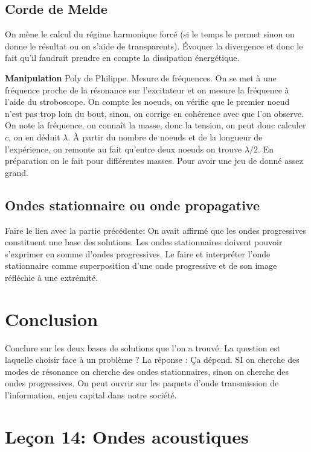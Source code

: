 \documentclass[french, a4paper, 10pt, twocolumn, landscape]{article}
\begin{document}
\subsection*{Corde de Melde}

On mène le calcul du régime harmonique forcé (si le temps le permet sinon on donne le résultat ou on s'aide de transparents). Évoquer la divergence et donc le fait qu'il faudrait prendre en compte la dissipation énergétique.

\textbf{Manipulation} Poly de Philippe. Mesure de fréquences. On se met à une fréquence proche de la résonance sur l'excitateur et on mesure la fréquence à l'aide du stroboscope. On compte les noeuds, on vérifie que le premier noeud n'est pas trop loin du bout, sinon, on corrige en cohérence avec que l'on observe. On note la fréquence, on connaît la masse, donc la tension, on peut donc calculer $c$, on en déduit $\lambda$. À partir du nombre de noeuds et de la longueur de l'expérience, on remonte au fait qu'entre deux noeuds on trouve $\lambda/2$. En préparation on le fait pour différentes masses. Pour avoir une jeu de donné assez grand.

\subsection*{Ondes stationnaire ou onde propagative}

Faire le lien avec la partie précédente: On avait affirmé que les ondes progressives constituent une base des solutions. Les ondes stationnaires doivent pouvoir s'exprimer en somme d'ondes progressives. Le faire et interpréter l'onde stationnaire comme superposition d'une onde progressive et de son image réfléchie à une extrémité.

\section*{Conclusion}

Conclure sur les deux bases de solutions que l'on a trouvé. La question est laquelle choisir face à un problème ? La réponse : Ça dépend. SI on cherche des modes de résonance on cherche des ondes stationnaires, sinon on cherche des ondes progressives. On peut ouvrir sur les paquets d'onde transmission de l'information, enjeu capital dans notre société.

\clearpage

\section*{Leçon 14: Ondes acoustiques}
\end{document}
